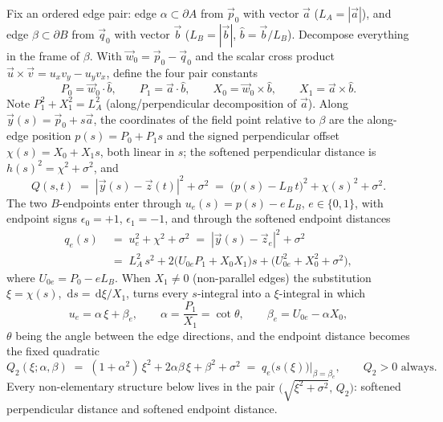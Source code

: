 \documentclass[11pt]{article}
\newcommand{\dd}{\,\mathrm{d}}
\begin{document}
Fix an ordered edge pair: edge $\alpha\subset\partial A$ from $\vec p_0$ with vector
$\vec a$ ($L_A=|\vec a|$), and edge $\beta\subset\partial B$ from $\vec q_0$ with
vector $\vec b$ ($L_B=|\vec b|$, $\hat b=\vec b/L_B$).  Decompose everything in the
frame of $\beta$.  With $\vec w_0=\vec p_0-\vec q_0$ and the scalar cross product
$\vec u\times\vec v = u_xv_y-u_yv_x$, define the four pair constants
\begin{equation}
  P_0=\vec w_0\cdot\hat b,\qquad P_1=\vec a\cdot\hat b,\qquad
  X_0=\vec w_0\times\hat b,\qquad X_1=\vec a\times\hat b .
  \label{eq:pairconsts}
\end{equation}
Note $P_1^2+X_1^2=L_A^2$ (along/perpendicular decomposition of $\vec a$).
Along $\vec y(s)=\vec p_0+s\vec a$, the coordinates of the field point relative to
$\beta$ are the along-edge position $p(s)=P_0+P_1 s$ and the signed perpendicular
offset $\chi(s)=X_0+X_1 s$, both linear in $s$; the softened perpendicular distance
is $h(s)^2=\chi^2+\sigma^2$, and
\begin{equation}
  Q(s,t) \;=\; |\vec y(s)-\vec z(t)|^2+\sigma^2
         \;=\; \bigl(p(s)-L_B\,t\bigr)^2 + \chi(s)^2 + \sigma^2 .
  \label{eq:Q}
\end{equation}
The two $B$-endpoints enter through $u_e(s) = p(s)-e\,L_B$, $e\in\{0,1\}$, with
endpoint signs $\epsilon_0=+1$, $\epsilon_1=-1$, and through the softened endpoint
distances
\begin{equation}
\begin{aligned}
  q_e(s) \;&=\; u_e^2+\chi^2+\sigma^2 \;=\; |\vec y(s)-\vec z_e|^2+\sigma^2\\
  &=\; L_A^2\,s^2 + 2\bigl(U_{0e}P_1+X_0X_1\bigr)s
       + \bigl(U_{0e}^2+X_0^2+\sigma^2\bigr),
\end{aligned}
  \label{eq:qe}
\end{equation}
where $U_{0e}=P_0-eL_B$.  When $X_1\neq0$ (non-parallel edges) the substitution
$\xi=\chi(s)$, $\dd s=\dd\xi/X_1$, turns every $s$-integral into a $\xi$-integral in
which
\begin{equation}
  u_e = \alpha\,\xi+\beta_e, \qquad
  \alpha=\frac{P_1}{X_1}=\cot\theta,\qquad \beta_e=U_{0e}-\alpha X_0 ,
  \label{eq:alphabeta}
\end{equation}
$\theta$ being the angle between the edge directions, and the endpoint distance
becomes the fixed quadratic
\begin{equation}
  Q_2(\xi;\alpha,\beta) \;=\; (1{+}\alpha^2)\,\xi^2+2\alpha\beta\,\xi+\beta^2+\sigma^2
  \;=\; q_e\bigl(s(\xi)\bigr)\Big|_{\beta=\beta_e},
  \qquad Q_2>0 \text{ always}.
  \label{eq:Q2}
\end{equation}
Every non-elementary structure below lives in the pair
$\bigl(\sqrt{\xi^2+\sigma^2},\,Q_2\bigr)$: softened perpendicular distance and
softened endpoint distance.
\end{document}
